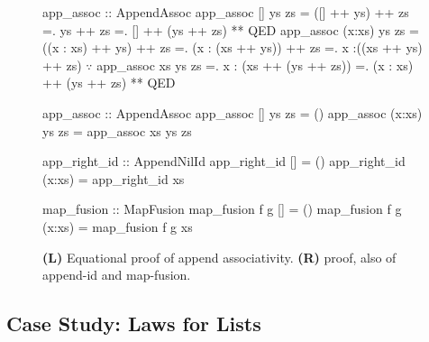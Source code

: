 \begin{figure}[t!]
\centering
\begin{minipage}[t]{0.45\textwidth}
\begin{mcodef}
app_assoc :: AppendAssoc
app_assoc [] ys zs
  = ([] ++ ys) ++ zs
  =. ys ++ zs
  =. [] ++ (ys ++ zs)         ** QED
app_assoc (x:xs) ys zs
  = ((x : xs) ++  ys)  ++ zs
  =. (x : (xs ++  ys)) ++ zs
  =.  x :((xs ++  ys)  ++ zs)
      $\because$ app_assoc xs ys zs
  =.  x : (xs ++ (ys   ++ zs))
  =. (x : xs) ++ (ys   ++ zs) ** QED
\end{mcodef}
\end{minipage}
\hspace{0.14in}
\begin{minipage}[t]{0.49\textwidth}
\begin{mcodef}
app_assoc             :: AppendAssoc
app_assoc []     ys zs = ()
app_assoc (x:xs) ys zs = app_assoc xs ys zs
\end{mcodef}
\begin{mcodef}
app_right_id          :: AppendNilId
app_right_id []        = ()
app_right_id (x:xs)    = app_right_id xs
\end{mcodef}
\begin{mcodef}
map_fusion            :: MapFusion
map_fusion f g []      = ()
map_fusion f g (x:xs)  = map_fusion f g xs
\end{mcodef}
\end{minipage}
\caption{\textbf{(L)} Equational proof of append associativity. \quad
  \textbf{(R)} \pbesym proof, also of append-id and map-fusion.
}
\label{fig:list-laws}
\end{figure}

\subsection{Case Study: Laws for Lists}
\label{sec:overview:lists}

